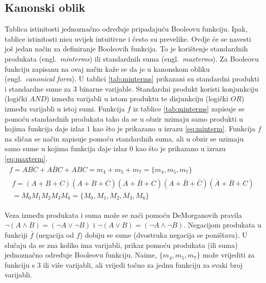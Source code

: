 \documentclass[times, utf8, diplomski]{fer}
\begin{document}
\subsection{Kanonski oblik}

Tablica istinitosti jednoznačno određuje pripadajuću Booleovu funkciju. Ipak, tablice istinitosti nisu uvijek intuitivne i često su prevelike. Ovdje će se navesti još jedan način za definiranje Booleovih funkcija. To je korištenje standardnih produkata (engl.~\textit{minterms}) ili standardnih suma (engl.~\textit{maxterms}). Za Booleovu funkciju zapisanu na ovaj način kaže se da je u kanonskom obliku (engl.~\textit{canonical form}). U tablici \ref{tab:minterms} prikazani su standardni produkti i standardne sume za $3$ binarne varijable. Standardni produkt koristi konjunkciju (logički $AND$) između varijabli u istom produktu te disjunkciju (logički $OR$) između varijabli u istoj sumi. Funkcija $f$ iz tablice \ref{tab:minterms} zapisuje se pomoću standardnih produkata tako da se u obzir uzimaju samo produkti u kojima funkcija daje izlaz $1$ kao što je prikazano u izrazu \ref{eq:minterm}. Funkcija $f$ na sličan se način zapisuje pomoću standardnih suma, ali u obzir se uzimaju samo sume u kojima funkcija daje izlaz $0$ kao što je prikazano u izrazu \ref{eq:maxterm}.
%
\begin{gather}
	\label{eq:minterm}
	f=A\overline{BC}+A\overline{B}C+ABC=m_{4}+m_{5}+m_{7}=\{m_{4}, m_{5}, m_{7}\} \\
	\label{eq:maxterm}
	\begin{split}
		f=(A+B+C)(A+B+\overline{C})(A+\overline{B}+C)(A+\overline{B}+\overline{C})(\overline{A}+\overline{B}+C) \\
		=M_{0}M_{1}M_{2}M_{3}M_{6}=\{M_{0}, M_{1}, M_{2}, M_{3}, M_{6}\}
	\end{split}
\end{gather}

\noindent
Veza između produkata i suma može se naći pomoću DeMorganovih pravila $\neg (A \land B)=(\neg A \lor \neg B)$ i $\neg (A \lor B)=(\neg A \land \neg B)$. Negacijom produkata u funkciji $\overline{f}$ (negacija od $f$) dobiju se sume (dvostruka negacija se poništava). U slučaju da se zna koliko ima varijabli, prikaz pomoću produkata (ili suma) jednoznačno određuje Booleovu funkciju. Naime, $\{m_{4}, m_{5}, m_{7}\}$ može vrijediti za funkciju s $3$ ili više varijabli, ali vrijedi točno za jednu funkciju za svaki broj varijabli.
\end{document}
